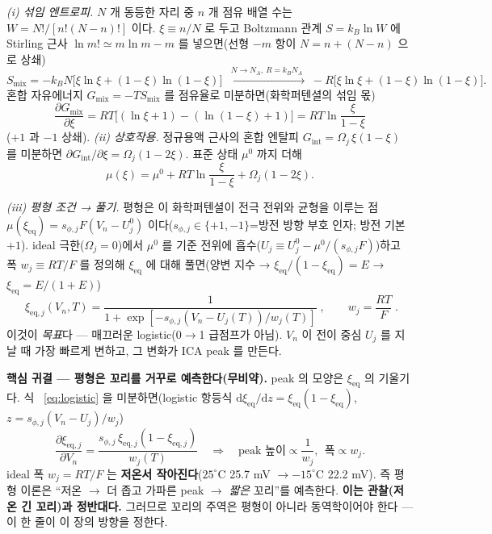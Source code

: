 \documentclass[11pt,a4paper]{article}
\newcommand{\dd}{\mathrm{d}}
\newcommand{\eq}{\mathrm{eq}}
\begin{document}
\emph{(i) 섞임 엔트로피.} $N$ 개 동등한 자리 중 $n$ 개 점유 배열 수는 $W=N!/[n!(N-n)!]$ 이다. $\xi\equiv
n/N$ 로 두고 Boltzmann 관계 $S=k_B\ln W$ 에 Stirling 근사 $\ln m!\simeq m\ln m-m$ 를 넣으면(선형 $-m$ 항이
$N=n+(N-n)$ 으로 상쇄)
\begin{equation}
S_{\mathrm{mix}}=-k_B N\big[\xi\ln\xi+(1-\xi)\ln(1-\xi)\big]\;\xrightarrow{\;N\to N_A,\ R=k_BN_A\;}\;
-R\big[\xi\ln\xi+(1-\xi)\ln(1-\xi)\big].
\label{eq:smix}
\end{equation}
혼합 자유에너지 $G_{\mathrm{mix}}=-TS_{\mathrm{mix}}$ 를 점유율로 미분하면(화학퍼텐셜의 섞임 몫)
\begin{equation}
\frac{\partial G_{\mathrm{mix}}}{\partial\xi}=RT\big[(\ln\xi+1)-(\ln(1-\xi)+1)\big]=RT\ln\frac{\xi}{1-\xi}
\label{eq:mu_mix}
\end{equation}
($+1$ 과 $-1$ 상쇄). \emph{(ii) 상호작용.} 정규용액 근사의 혼합 엔탈피 $G_{\mathrm{int}}=\Omega_j\,\xi(1-\xi)$
를 미분하면 $\partial G_{\mathrm{int}}/\partial\xi=\Omega_j(1-2\xi)$. 표준 상태 $\mu^0$ 까지 더해
\begin{equation}
\mu(\xi)=\mu^0+RT\ln\frac{\xi}{1-\xi}+\Omega_j(1-2\xi).
\label{eq:mu_latticegas}
\end{equation}

\emph{(iii) 평형 조건 → 풀기.} 평형은 이 화학퍼텐셜이 전극 전위와 균형을 이루는 점
$\mu(\xi_\eq)=s_{\phi,j}F(V_n-U_j^0)$ 이다($s_{\phi,j}\in\{+1,-1\}$=방전 방향 부호 인자; 방전 기본 $+1$).
ideal 극한($\Omega_j=0$)에서 $\mu^0$ 를 기준 전위에 흡수($U_j\equiv U_j^0-\mu^0/(s_{\phi,j}F)$)하고 폭
$w_j\equiv RT/F$ 를 정의해 $\xi_\eq$ 에 대해 풀면(양변 지수 → $\xi_\eq/(1-\xi_\eq)=E$ → $\xi_\eq=E/(1+E)$)
\begin{equation}
\boxed{\;\xi_{\eq,j}(V_n,T)=\frac{1}{1+\exp[-s_{\phi,j}(V_n-U_j(T))/w_j(T)]}\;,\qquad w_j=\frac{RT}{F}\;.}
\label{eq:logistic}
\end{equation}
이것이 \emph{목표}다 — 매끄러운 logistic(0$\to$1 급점프가 아님). $V_n$ 이 전이 중심 $U_j$ 를 지날 때 가장
빠르게 변하고, 그 변화가 ICA peak 를 만든다.

\textbf{핵심 귀결 — 평형은 꼬리를 거꾸로 예측한다(무비약).} peak 의 모양은 $\xi_\eq$ 의 기울기다. 식~
\eqref{eq:logistic} 을 미분하면(logistic 항등식 $\dd\xi_\eq/\dd z=\xi_\eq(1-\xi_\eq)$, $z=s_{\phi,j}(V_n-U_j)/w_j$)
\begin{equation}
\frac{\partial\xi_{\eq,j}}{\partial V_n}=\frac{s_{\phi,j}\,\xi_{\eq,j}(1-\xi_{\eq,j})}{w_j(T)}
\quad\Rightarrow\quad \text{peak 높이}\propto\frac1{w_j},\ \ \text{폭}\propto w_j.
\label{eq:dxidV}
\end{equation}
ideal 폭 $w_j=RT/F$ 는 \textbf{저온서 작아진다}($25^\circ$C 25.7 mV $\to-15^\circ$C 22.2 mV). 즉 평형
이론은 ``저온 $\to$ 더 좁고 가파른 peak $\to$ \emph{짧은} 꼬리''를 예측한다. \textbf{이는 관찰(저온 긴 꼬리)과
정반대다.} 그러므로 꼬리의 주역은 평형이 아니라 동역학이어야 한다 — 이 한 줄이 이 장의 방향을 정한다.
\end{document}
